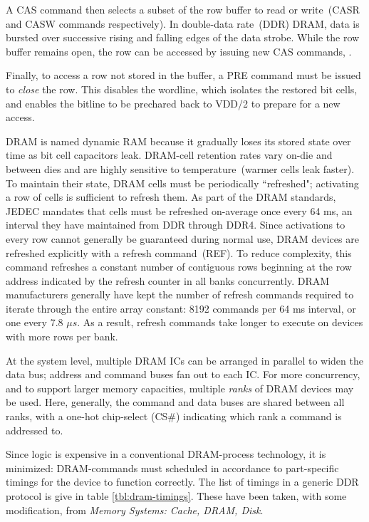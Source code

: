 A CAS command then selects a subset of the row buffer to read or write~(CASR
and CASW commands respectively). In double-data rate~(DDR) DRAM, data is
bursted over successive rising and falling edges of the data strobe. While the
row buffer remains open, the row can be accessed by issuing new CAS commands, .

Finally, to access a row not stored in the buffer, a PRE command must be issued
to \emph{close} the row. This disables the wordline, which isolates the
restored bit cells, and enables the bitline to be prechared back to VDD/2 to
prepare for a new access.

DRAM is named dynamic RAM because it gradually loses its stored state over time
as bit cell capacitors leak. DRAM-cell retention rates vary on-die and between
dies and are highly sensitive to temperature~(warmer cells leak faster). To
maintain their state, DRAM cells must be periodically ``refreshed"; activating
a row of cells is sufficient to refresh them. As part of the DRAM standards,
JEDEC mandates that cells must be refreshed on-average once every 64 ms, an
interval they have maintained from DDR through DDR4. Since activations to every
row cannot generally be guaranteed during normal use, DRAM devices are
refreshed explicitly with a refresh command~(REF). To reduce complexity, this
command refreshes a constant number of contiguous rows beginning at the row
address indicated by the refresh counter in all banks concurrently. DRAM
manufacturers generally have kept the number of refresh commands required to
iterate through the entire array constant: 8192 commands per 64 ms interval, or
one every 7.8 $\mu s$.  As a result, refresh commands take longer to execute on
devices with more rows per bank.

At the system level, multiple DRAM ICs can be arranged in parallel to widen the
data bus; address and command buses fan out to each IC. For more concurrency,
and to support larger memory capacities, multiple \emph{ranks} of DRAM devices
may be used.  Here, generally, the command and data buses are shared between
all ranks, with a one-hot chip-select (CS\#) indicating which rank a command is
addressed to.

Since logic is expensive in a conventional DRAM-process technology, it is
minimized: DRAM-commands must scheduled in accordance to part-specific timings
for the device to function correctly. The list of timings in a generic DDR
protocol is give in table \ref{tbl:dram-timings}. These have been taken, with
some modification, from \textit{Memory Systems: Cache, DRAM,
Disk}\cite{drambook}.

